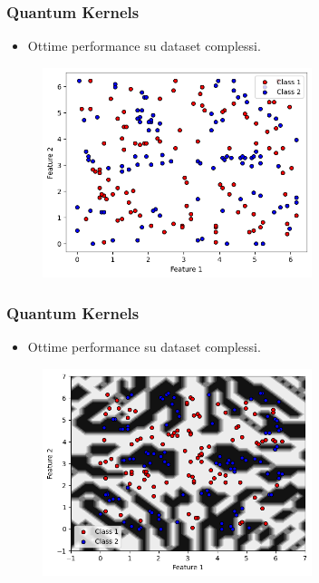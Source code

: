 \documentclass{beamer}
\begin{document}
\begin{frame}
  \frametitle{Quantum Kernels}
  
  \begin{itemize}
    \item Ottime performance su dataset complessi. 
  \end{itemize}
        \begin{figure}
          \includegraphics[width=0.7\textwidth]{images/adhoc.png}
        \end{figure}
        
\end{frame}

\begin{frame}
  \frametitle{Quantum Kernels}
  
  \begin{itemize}
    \item Ottime performance su dataset complessi.  
  \end{itemize}
        \begin{figure}
          \includegraphics[width=0.7\textwidth]{images/adhoczz.png}
        \end{figure}
        
\end{frame}
\end{document}

